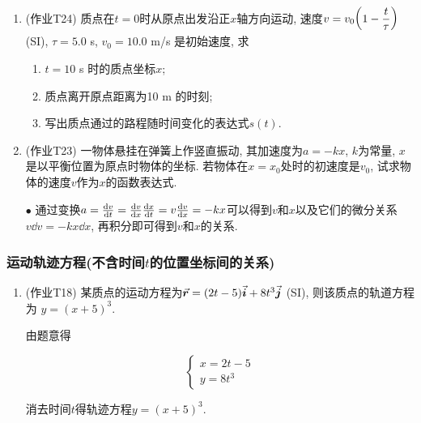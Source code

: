 \begin{enumerate}
	
	\item (作业T24) 质点在$t = 0$时从原点出发沿正$x$轴方向运动, 速度$v = v_0 \qty(1 - \dfrac{t}{\tau})$ (SI), $\tau = 5.0$ s, $v_0 = 10.0$ m/s 是初始速度, 求
	
	\begin{enumerate}
		
		\item $t = 10$ s 时的质点坐标$x$; 
		
		\item 质点离开原点距离为10 m 的时刻; 
		
		\item 写出质点通过的路程随时间变化的表达式$s(t)$. 
		
	\end{enumerate}
	
	\item (作业T23) 一物体悬挂在弹簧上作竖直振动, 其加速度为$a = -kx$, $k$为常量, $x$是以平衡位置为原点时物体的坐标. 若物体在$x = x_0$处时的初速度是$v_0$, 试求物体的速度$v$作为$x$的函数表达式. 
	
	\vskip 0.1cm
	
	\begin{note}
		$\bullet$ 通过变换$a = \dv{v}{t} = \dv{v}{x} \dv{x}{t} = v \dv{v}{x} = -kx$可以得到$v$和$x$以及它们的微分关系$v \dd{v} = -kx \dd{x}$, 再积分即可得到$v$和$x$的关系. 
	\end{note}
	
\end{enumerate}

\subsubsection{运动轨迹方程(不含时间$t$的位置坐标间的关系)}

\begin{enumerate}
	
	\item (作业T18) 某质点的运动方程为$\va*{r} = (2t - 5) \va*{i} + 8t^3 \va*{j}$ (SI), 则该质点的轨道方程为 \uline{$y = (x + 5)^3$}. 
	
	\vskip 0.1cm
	
	\begin{solution}
		由题意得
		
		\begin{equation*}
			\begin{cases}
				x = 2t - 5 \\
				y = 8t^3
			\end{cases}
		\end{equation*}
		
		消去时间$t$得轨迹方程$y = (x + 5)^3$. 
		
	\end{solution}
	
\end{enumerate}

